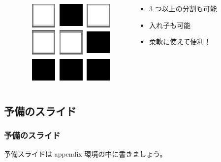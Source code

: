 \documentclass[dvipdfmx,cjk,xcolor=dvipsnames,envcountsect,notheorems,12pt]{beamer}
\theoremstyle{definition}
\begin{document}
\begin{frame}
\begin{columns}
\begin{column}{0.4\textwidth}
\begin{columns}
\begin{column}{0.33\textwidth}
        \end{column}
        \begin{column}{0.33\textwidth}
          \includegraphics[width=\textwidth]{sample-image.eps}
        \end{column}
      \end{columns}
    \end{column}
    \begin{column}{0.6\textwidth}
      \begin{itemize}
      \item 3 つ以上の分割も可能
      \item 入れ子も可能
      \item 柔軟に使えて便利！
      \end{itemize}
    \end{column}
  \end{columns}
\end{frame}


\begin{appendix}


\section{予備のスライド}

\begin{frame}
  \frametitle{予備のスライド}
  予備スライドは appendix 環境の中に書きましょう。
\end{frame}

\end{appendix}
\end{document}
